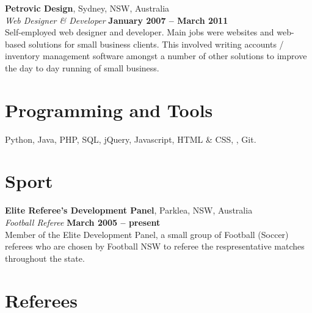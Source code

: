 \documentclass[margin,line]{resume}
\begin{document}
\begin{resume}
    \textbf{Petrovic Design}, Sydney, NSW, Australia \vspace{2mm}\\\vspace{1mm}%
    \textsl{Web Designer \& Developer} \hfill \textbf{January 2007 -- March 2011}\\
    Self-employed web designer and developer. Main jobs were websites and web-based solutions for small business clients.
    This involved writing accounts / inventory management software amongst a number of other solutions to improve the day
    to day running of small business.
 
    \section{\mysidestyle Programming and Tools} 

    Python, Java, PHP, SQL, jQuery, Javascript, HTML \& CSS, \LaTeXe, Git.


\newpage

\vspace{5mm}
\section{\mysidestyle Sport}
	
	\textbf{Elite Referee's Development Panel}, Parklea, NSW, Australia \vspace{2mm}\\\vspace{1mm}%
	\textsl{Football Referee} \hfill \textbf{March 2005 -- present}\\
	Member of the Elite Development Panel, a small group of Football (Soccer) referees who are chosen by Football NSW
	to referee the respresentative matches throughout the state.


\section{\mysidestyle Referees} 


\end{resume}
\end{document}
